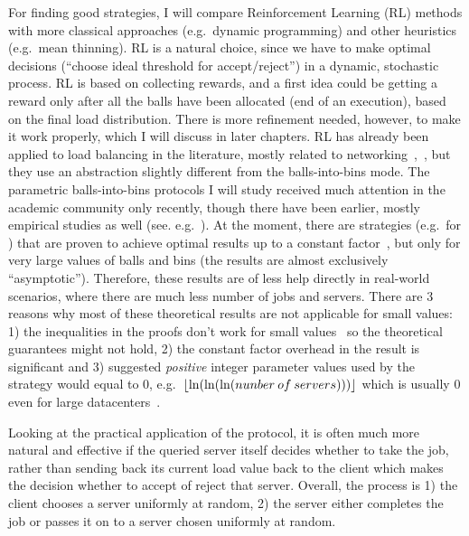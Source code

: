 For finding good strategies, I will compare Reinforcement Learning (RL) methods with more classical approaches (e.g.\ dynamic programming) and other heuristics (e.g.\ mean thinning). RL is a natural choice, since we have to make optimal decisions (``choose ideal threshold for accept/reject'') in a dynamic, stochastic process. RL is based on collecting rewards, and a first idea could be getting a reward only after all the balls have been allocated (end of an execution), based on the final load distribution. There is more refinement needed, however, to make it work properly, which I will discuss in later chapters. RL has already been applied to load balancing in the literature, mostly related to networking~\cite{attiah2020RLcellular},~\cite{yeo2021controller}, but they use an abstraction slightly different from the balls-into-bins mode. The parametric balls-into-bins protocols I will study received much attention in the academic community only recently, though there have been earlier, mostly empirical studies as well (see. e.g.~\cite{derek1986twothinningfirstattempt}). At the moment, there are strategies (e.g.\ for \TwoThinning) that are proven to achieve optimal results up to a constant factor~\cite{feldheim2021thinning}, but only for very large values of balls and bins (the results are almost exclusively ``asymptotic''). Therefore, these results are of less help directly in real-world scenarios, where there are much less number of jobs and servers. There are $3$ reasons why most of these theoretical results are not applicable for small values: 1) the inequalities in the proofs don't work for small values~\cite{feldheim2021longtermthinning} so the theoretical guarantees might not hold, 2) the constant factor overhead in the result is significant and 3) suggested \textit{positive} integer parameter values used by the strategy would equal to $0$, e.g.\ $\lfloor\ln(\ln(\ln(nunber\: of \: servers)))\rfloor$ which is usually $0$ even for large datacenters~\cite{uzaman2019datacentersize}.



Looking at the practical application of the \TwoThinning protocol, it is often much more natural and effective if the queried server itself decides whether to take the job, rather than sending back its current load value back to the client which makes the decision whether to accept of reject that server.  Overall, the process is 1) the client chooses a server uniformly at random, 2) the server either completes the job or passes it on to a server chosen uniformly at random.

